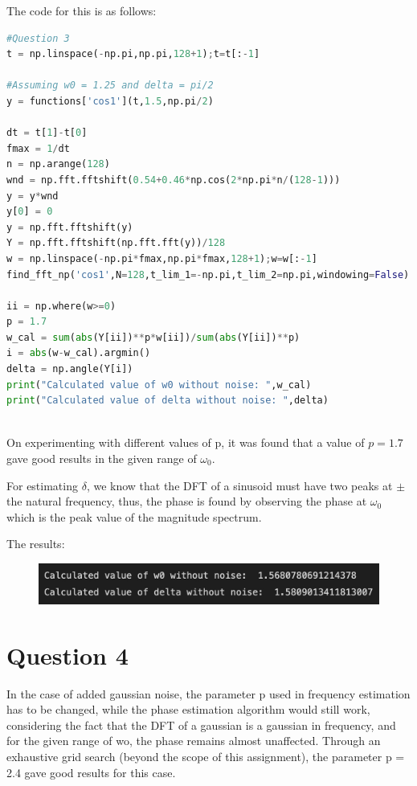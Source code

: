 \documentclass[11pt, a4paper]{article}
\begin{document}
The code for this is as follows:

\begin{lstlisting}[language = Python]
#Question 3
t = np.linspace(-np.pi,np.pi,128+1);t=t[:-1]

#Assuming w0 = 1.25 and delta = pi/2
y = functions['cos1'](t,1.5,np.pi/2)

dt = t[1]-t[0]
fmax = 1/dt
n = np.arange(128)
wnd = np.fft.fftshift(0.54+0.46*np.cos(2*np.pi*n/(128-1)))
y = y*wnd
y[0] = 0
y = np.fft.fftshift(y)
Y = np.fft.fftshift(np.fft.fft(y))/128
w = np.linspace(-np.pi*fmax,np.pi*fmax,128+1);w=w[:-1]
find_fft_np('cos1',N=128,t_lim_1=-np.pi,t_lim_2=np.pi,windowing=False)

ii = np.where(w>=0)
p = 1.7
w_cal = sum(abs(Y[ii])**p*w[ii])/sum(abs(Y[ii])**p)
i = abs(w-w_cal).argmin()
delta = np.angle(Y[i])
print("Calculated value of w0 without noise: ",w_cal)
print("Calculated value of delta without noise: ",delta)



\end{lstlisting}

On experimenting with different values of p, it was found that a value of
$p = 1.7$ gave good results in the given range of $\omega_0$.

For estimating $\delta$, we know that the DFT of a sinusoid must have two peaks at $\pm$ the natural frequency, thus, the phase is found by observing the phase at $\omega_0$ which is the peak value of the magnitude spectrum.

The results:
\begin{figure}[H]
     \centering
     \includegraphics[scale=0.6]{Figure_10.png}
\end{figure}

\section{Question 4}
In the case of added gaussian noise, the parameter p used in frequency estimation has to be changed, while the phase estimation algorithm would still
work, considering the fact that the DFT of a gaussian is a gaussian in frequency, and for the given range of wo, the phase remains almost unaffected.
Through an exhaustive grid search (beyond the scope of this assignment), the parameter p = 2.4 gave good results
for this case. 
\end{document}
